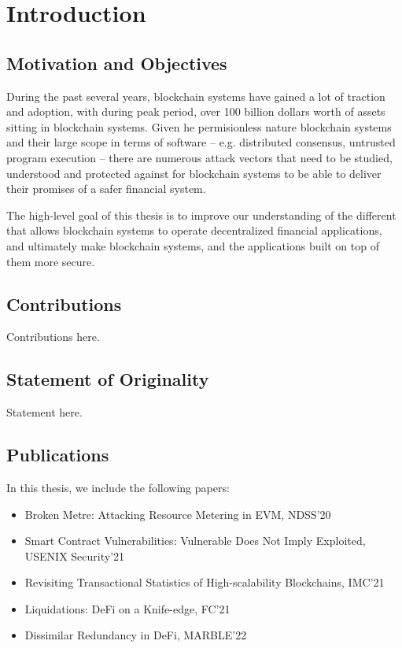 \chapter{Introduction}

\section{Motivation and Objectives}
During the past several years, blockchain systems have gained a lot of traction and adoption, with during peak period, over 100 billion dollars worth of assets sitting in blockchain systems.
Given he permisionless nature blockchain systems and their large scope in terms of software -- e.g. distributed consensus, untrusted program execution -- there are numerous attack vectors that need to be studied, understood and protected against for blockchain systems to be able to deliver their promises of a safer financial system.

The high-level goal of this thesis is to improve our understanding of the different that allows blockchain systems to operate decentralized financial applications, and ultimately make blockchain systems, and the applications built on top of them more secure.



\section{Contributions}

Contributions here.


\section{Statement of Originality}

Statement here.


\section{Publications}

In this thesis, we include the following papers:

\begin{itemize}
\item Broken Metre: Attacking Resource Metering in EVM, NDSS'20
\item Smart Contract Vulnerabilities: Vulnerable Does Not Imply Exploited, USENIX Security'21
\item Revisiting Transactional Statistics of High-scalability Blockchains, IMC'21
\item Liquidations: DeFi on a Knife-edge, FC'21
\item Dissimilar Redundancy in DeFi, MARBLE'22
\end{itemize}
